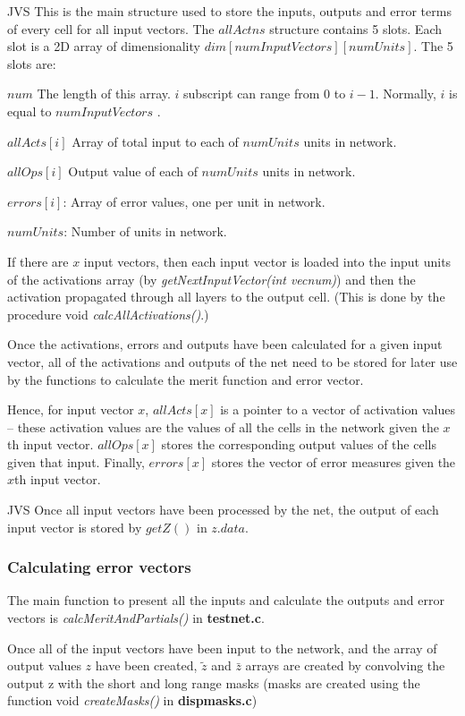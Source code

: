 \documentclass[a4paper]{article}
\newcommand{\zbar}{\bar{z}}
\newcommand{\ztilde}{\tilde{z}}
\begin{document}
JVS This is the main structure used to store the inputs, outputs
and error terms of every cell for all input vectors. The $allActns$ structure
contains 5 slots. Each slot is a 2D array of dimensionality
$dim[numInputVectors][numUnits]$. The 5 slots are: 

$num$ The length of this array.  $i$ subscript can range from 0 to
$i-1$. Normally, $i$ is equal to  $numInputVectors$ .
 
$allActs[i]$ Array of total input to each of $numUnits$ units in network.

$allOps[i]$ Output value of each of $numUnits$ units in network.

$errors[i]$: Array of error values, one per unit in network.

$numUnits$: Number of units in network.

If there are $x$ input vectors, then each input vector is loaded into
the input units of the activations array (by  {\em getNextInputVector(int
vecnum)}) and then the activation propagated through all layers to the
output cell. (This is done by the procedure void {\em calcAllActivations()}.)

Once the activations, errors and outputs have been calculated for a given
input vector, all of the activations and outputs of the net need to be
stored for later use by the functions to calculate the merit function
and error vector.

Hence, for input vector $x$, $allActs[x]$ is a pointer to a vector of
activation values -- these activation values are the values of all the
cells in the network given the $x$th input vector.  $allOps[x]$ stores
the corresponding output values of the cells given that input.
Finally, $errors[x]$ stores the vector of error measures given the $x$th
input vector.

JVS Once all input vectors have been processed by the net, the 
output of each input vector is stored by $getZ()$ in $z.data$.

\subsubsection{Calculating error vectors}

The main function to present all the inputs and calculate the outputs
and error vectors is  {\em calcMeritAndPartials()} in {\bf testnet.c}.

Once all of the input vectors have been input to the network, and the
array of output values $z$ have been created, $\ztilde$ and $\zbar$ arrays
are created by convolving the output z with the short and long range
masks (masks are created using the function void {\em createMasks()} in
{\bf dispmasks.c})
\end{document}
